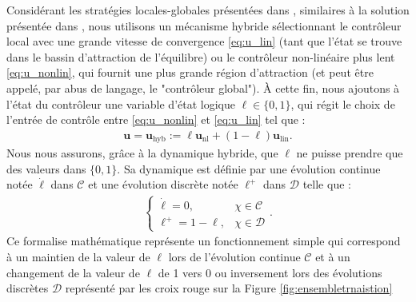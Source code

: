Considérant les stratégies locales-globales présentées dans \cite[Ex. 1. 7]{65}, similaires à la solution présentée dans \cite{AndreettoFZ16}, nous utilisons un mécanisme hybride sélectionnant le contrôleur local avec une grande vitesse de convergence \eqref{eq:u_lin} (tant que l'état se trouve dans le bassin d'attraction de l'équilibre) ou le contrôleur non-linéaire plus lent \eqref{eq:u_nonlin}, qui fournit une plus grande région d'attraction (et peut être appelé, par abus de langage, le "contrôleur global"). À cette fin, nous ajoutons à l'état du contrôleur une variable d'état logique $\ell \in \{0,1\}$, qui régit le choix de l'entrée de contrôle entre \eqref{eq:u_nonlin} et \eqref{eq:u_lin} tel que :
\begin{align}
\label{eq:u_hybrid}
  \boldsymbol{u}=\boldsymbol{u}_{\text{hyb}} := \ell \boldsymbol{u}_{\text{nl}} + (1-\ell) \boldsymbol{u}_{\text{lin}}.
\end{align}
Nous nous assurons, grâce à la dynamique hybride, que $\ell$ ne puisse prendre que des valeurs dans $\{0,1\}$. Sa dynamique est définie par une évolution continue notée $\dot \ell$ dans $\mathcal{C}$ et une évolution discrète notée $\ell^{+}$ dans $\mathcal{D}$ telle que : 
\begin{align}
    \left\{
        \begin{array}{ll}
            \dot \ell = 0,& \chi \in \mathcal{C}\\
            \ell^{+} = 1-\ell,& \chi \in \mathcal{D}
        \end{array}.
    \right.
\end{align}
Ce formalise mathématique représente un fonctionnement simple qui correspond à un maintien de la valeur de $\ell$ lors de l'évolution continue $\mathcal{C}$ et à un changement de la valeur de $\ell$ de 1 vers 0 ou inversement lors des évolutions discrètes $\mathcal{D}$ représenté par les croix rouge sur la Figure \ref{fig:ensembletrnaistion}



